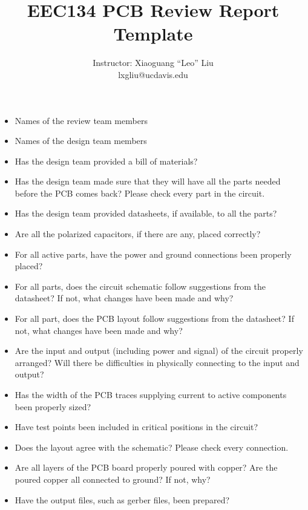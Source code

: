 \documentclass[letterpaper, 11pt]{article}
\title{EEC134 PCB Review Report Template}
\author{Instructor: Xiaoguang ``Leo'' Liu \\ lxgliu@ucdavis.edu}
\date{}
\begin{document}
\maketitle

\begin{itemize}[itemsep=3ex]

	\item Names of the review team members

	\item Names of the design team members

	\item Has the design team provided a bill of materials?

	\item Has the design team made sure that they will have all the parts needed before the PCB comes back? Please check every part in the circuit. 

	\item Has the design team provided datasheets, if available, to all the parts?

	\item Are all the polarized capacitors, if there are any, placed correctly?

	\item For all active parts, have the power and ground connections been properly placed?

	\item For all parts, does the circuit schematic follow suggestions from the datasheet? If not, what changes have been made and why?

	\item For all part, does the PCB layout follow suggestions from the datasheet? If not, what changes have been made and why?

	\item Are the input and output (including power and signal) of the circuit properly arranged? Will there be difficulties in physically connecting to the input and output?
	
	\item Has the width of the PCB traces supplying current to active components been properly sized?
	 
	\item Have test points been included in critical positions in the circuit?

	\item Does the layout agree with the schematic? Please check every connection. 

	\item Are all layers of the PCB board properly poured with copper? Are the poured copper all connected to ground? If not, why?

	\item Have the output files, such as gerber files, been prepared?

\end{itemize}
\end{document}
